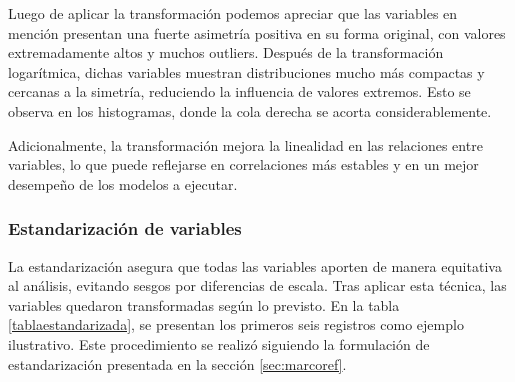 Luego de aplicar la transformación podemos apreciar que las variables en mención presentan una fuerte asimetría positiva en su forma original, con valores extremadamente altos y muchos outliers. Después de la transformación logarítmica, dichas variables muestran distribuciones mucho más compactas y cercanas a la simetría, reduciendo la influencia de valores extremos. Esto se observa en los histogramas, donde la cola derecha se acorta considerablemente.

Adicionalmente, la transformación mejora la linealidad en las relaciones entre variables, lo que puede reflejarse en correlaciones más estables y en un mejor desempeño de los modelos a ejecutar.


\subsubsection{Estandarización de variables}
La estandarización asegura que todas las variables aporten de manera equitativa al análisis, evitando sesgos por diferencias de escala. Tras aplicar esta técnica, las variables quedaron transformadas según lo previsto. En la tabla \ref{tablaestandarizada}, se presentan los primeros seis registros como ejemplo ilustrativo. Este procedimiento se realizó siguiendo la formulación de estandarización presentada en la sección \ref{sec:marcoref}.

\begin{table}[H]
\centering
\caption{\label{tablaestandarizada}Valores Estandarizados Variables}
\end{table}

